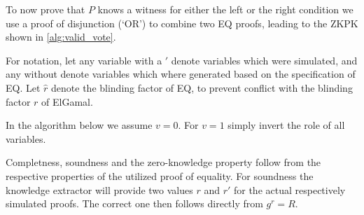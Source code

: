 \documentclass[a4paper]{scrreprt}
\begin{document}
To now prove that $P$ knows a witness for either the left or the right
condition we use a proof of disjunction (`OR') to combine two EQ proofs,
leading to the ZKPK shown in \ref{alg:valid_vote}.

For notation, let any variable with a $'$ denote variables which were
simulated, and any without denote variables which where generated based on the
specification of EQ. Let $\hat{r}$ denote the blinding factor of EQ, to prevent
conflict with the blinding factor $r$ of ElGamal.

In the algorithm below we assume $v = 0$. For $v = 1$ simply invert the role of
all variables.


Completness, soundness and the zero-knowledge property follow from the
respective properties of the utilized proof of equality. For soundness the
knowledge extractor will provide two values $r$ and $r'$ for the actual
respectively simulated proofs. The correct one then follows directly from $g^r
= R$.
\end{document}

